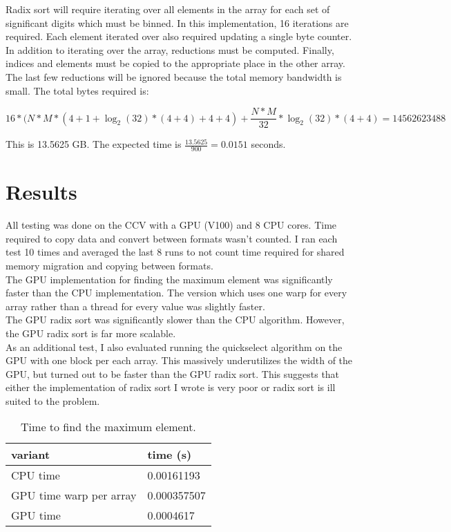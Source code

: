 \documentclass{article}
\begin{document}
Radix sort will require iterating over all elements in the array for each set
of significant digits which must be binned. In this implementation, 16
iterations are required. Each element iterated over also required updating a
single byte counter. In addition to iterating over the array, reductions 
must be computed. Finally, indices and elements must be copied to the 
appropriate place in the other array. The last few reductions will be ignored 
because the total memory bandwidth is small. The total bytes required is:

$$16 *  (N * M * (4 + 1 + \log_2(32) * (4 + 4) + 4 + 4) + \frac{N * M}{32} * 
\log_2(32) * (4 + 4) = 14562623488$$

This is 13.5625 GB. The expected time is $\frac{13.5625}{900} = 0.0151$ seconds.

\section{Results}

All testing was done on the CCV with a GPU (V100) and 8 CPU cores.  Time
required to copy data and convert between formats wasn't counted. I ran each
test 10 times and averaged the last 8 runs to not count time required for
shared memory migration and copying between formats. \\

The GPU implementation for finding the maximum element was significantly faster
than the CPU implementation. The version which uses one warp for every array
rather than a thread for every value was slightly faster. \\

The GPU radix sort was significantly slower than the CPU algorithm. However,
the GPU radix sort is far more scalable. \\

As an additional test, I also evaluated running the quickselect algorithm on
the GPU with one block per each array. This massively underutilizes the width of
the GPU, but turned out to be faster than the GPU radix sort. This suggests 
that either the implementation of radix sort I wrote is very poor or radix sort 
is ill suited to the problem.
 
\begin{table}[h]
  \centering
  \begin{tabular}{|l|l|}
    \hline
    variant                 & time (s) \\ \hline
    CPU time                & 0.00161193 \\ \hline
    GPU time warp per array & 0.000357507 \\ \hline
    GPU time                & 0.0004617 \\ \hline
  \end{tabular}
  \caption{Time to find the maximum element.}
\end{table}
\end{document}
